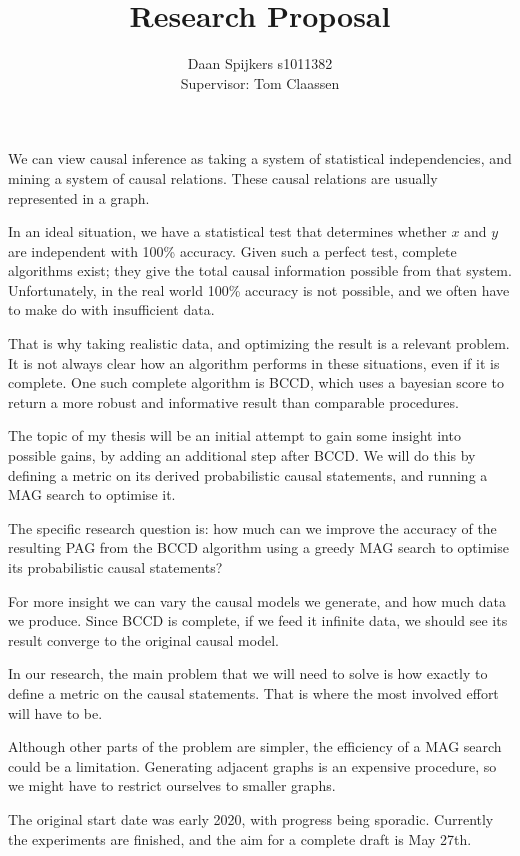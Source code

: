 \documentclass{article}
\author{Daan Spijkers s1011382 \\ Supervisor: Tom Claassen}
\title{Research Proposal}
\begin{document}
\maketitle

We can view causal inference as taking a system of statistical
independencies, and mining a system of causal relations. These causal
relations are usually represented in a graph.

In an ideal situation, we have a statistical test that determines
whether $x$ and $y$ are independent with 100\% accuracy. Given such a
perfect test, complete algorithms exist; they give the total causal
information possible from that system. Unfortunately, in the real world
100\% accuracy is not possible, and we often have to make do with
insufficient data.

That is why taking realistic data, and optimizing the result is a relevant
problem. It is not always clear how an algorithm performs in these
situations, even if it is complete. One such complete algorithm is BCCD,
which uses a bayesian score to return a more robust and informative result
than comparable procedures.

The topic of my thesis will be an initial attempt to gain some insight
into possible gains, by adding an additional step after BCCD. We will do
this by defining a metric on its derived probabilistic causal statements,
and running a MAG search to optimise it.

The specific research question is: how much can we improve the accuracy of
the resulting PAG from the BCCD algorithm using a greedy MAG search
to optimise its probabilistic causal statements?

For more insight we can vary the causal models we generate, and how much
data we produce. Since BCCD is complete, if we feed it infinite data, we
should see its result converge to the original causal model.

In our research, the main problem that we will need to solve is how
exactly to define a metric on the causal statements. That is where the most
involved effort will have to be.

Although other parts of the problem are simpler, the efficiency of a MAG
search could be a limitation. Generating adjacent graphs is an
expensive procedure, so we might have to restrict ourselves to smaller
graphs.

The original start date was early 2020, with progress being sporadic.
Currently the experiments are finished, and the aim for a complete draft
is May 27th.
\end{document}

